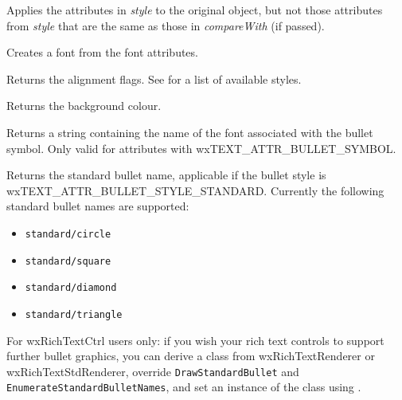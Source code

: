 Applies the attributes in {\it style} to the original object, but not those attributes from {\it style} that are the same as those in {\it compareWith} (if passed).

\label{wxtextattrcreatefont}


Creates a font from the font attributes.

\label{wxtextattrgetalignment}


Returns the alignment flags.
See  for a list of available styles.

\label{wxtextattrgetbackgroundcolour}


Returns the background colour.

\label{wxtextattrgetbulletfont}


Returns a string containing the name of the font associated with the bullet symbol.
Only valid for attributes with wxTEXT\_ATTR\_BULLET\_SYMBOL.

\label{wxtextattrgetbulletname}


Returns the standard bullet name, applicable if the bullet style is wxTEXT\_ATTR\_BULLET\_STYLE\_STANDARD.
Currently the following standard bullet names are supported:

\begin{itemize}\itemsep=0pt
\item {\tt standard/circle}
\item {\tt standard/square}
\item {\tt standard/diamond}
\item {\tt standard/triangle}
\end{itemize}

For wxRichTextCtrl users only: if you wish your rich text controls to support further bullet graphics, you can derive a
class from wxRichTextRenderer or wxRichTextStdRenderer, override {\tt DrawStandardBullet} and {\tt EnumerateStandardBulletNames}, and
set an instance of the class using .

